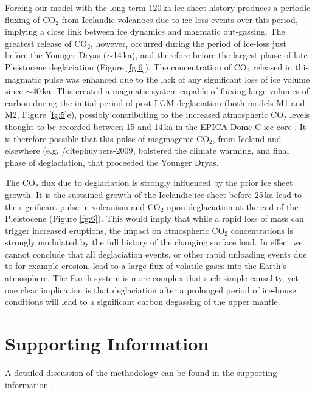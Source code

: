 \documentclass[draft,linenumbers]{agujournal2018}
\begin{document}
Forcing our model with the long-term 120\,ka ice sheet history produces a periodic fluxing of CO$_{2}$ from Icelandic volcanoes due to ice-loss events over this period, implying a close link between ice dynamics and magmatic out-gassing. The greatest release of CO$_{2}$, however, occurred during the period of ice-loss just before the Younger Dryas ($\sim$14\,ka), and therefore before the largest phase of late-Pleistocene deglaciation (Figure \ref{fg:6}). The concentration of CO$_{2}$ released in this magmatic pulse was enhanced due to the lack of any significant loss of ice volume since $\sim$40\,ka. This created a magmatic system capable of fluxing large volumes of carbon during the initial period of post-LGM deglaciation (both models M1 and M2, Figure \ref{fg:5}e), possibly contributing to the increased atmospheric CO$_{2}$ levels thought to be recorded between 15 and 14\,ka in the EPICA Dome C ice core \citep{kohler-etal-2011}. It is therefore possible that this pulse of magmagenic CO$_{2}$, from Iceland and elsewhere (e.g. /citep{huybers-2009},  bolstered the climate warming, and final phase of deglaciation, that proceeded the Younger Dryas.

The CO$_{2}$ flux due to deglaciation is strongly influenced by the prior ice sheet growth. It is the sustained growth of the Icelandic ice sheet before 25\,ka lead to the significant pulse in volcanism and CO$_{2}$ upon deglaciation at the end of the Pleistocene (Figure \ref{fg:6}). This would imply that while a rapid loss of mass can trigger increased eruptions, the impact on atmospheric CO$_{2}$ concentrations is strongly modulated by the full history of the changing surface load. In effect we cannot conclude that all deglaciation events, or other rapid unloading events due to for example erosion, lead to a large flux of volatile gases into the Earth’s atmosphere. The Earth system is more complex that such simple causality, yet one clear implication is that deglaciation after a prolonged period of ice-house conditions will lead to a significant carbon degassing of the upper mantle.

\section*{Supporting Information}

A detailed discussion of the methodology can be found in the supporting information \citep{andersen-etal-2004,andrews-2008,armitage-etal-g3-2011,clark-etal-2009,geirsdottir-2011,gibson-2010,gurenko-1995,katz-etal-2003,lambeck-2001,lambeck-etal-2014,mckenzie-1991,miller-etal-2014,ribe-1985,scott-1992,shorttle-2011,silbeck-1975,sleep-1976,spiegelman-1996,spratt-2016}.
\end{document}
